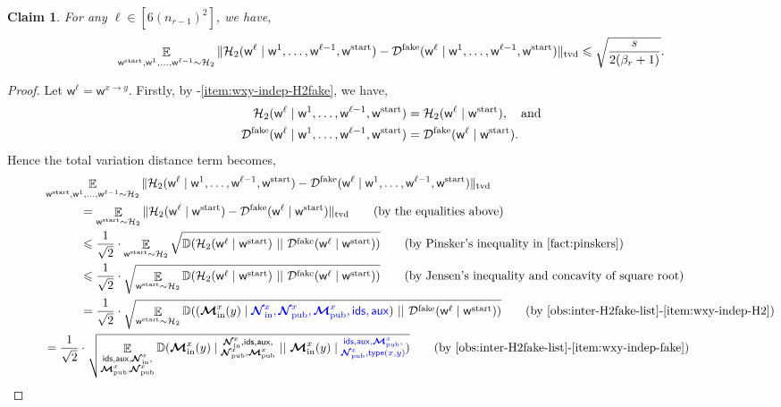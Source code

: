 \documentclass[11pt]{article}
\newtheorem{claim}[lemma]{Claim}
\theoremstyle{definition}
\renewcommand{\leq}{\leqslant}
\newcommand{\tvd}[2]{\ensuremath{\norm{#1 - #2}_{\mathrm{tvd}}}}
\newcommand{\norm}[1]{\ensuremath{\|#1\|}}
\DeclareMathOperator*{\Exp}{\ensuremath{{\mathbb{E}}}}
\newcommand{\rv}[1]{\ensuremath{{\mathsf{#1}}}\xspace}
\newcommand{\kl}[2]{\ensuremath{\mathbb{D}(#1~||~#2)}}
\newcommand{\rtypeval}[1]{\ensuremath{\rv{type}(#1)}}
\newcommand{\rNinner}[2]{\ensuremath{\bm{\mathcal{N}}_{\textnormal{in}}^{#1_{#2}}}}
\newcommand{\cH}{\ensuremath{\mathcal{H}}}
\newcommand{\cD}{\ensuremath{\mathcal{D}}}
\newcommand{\cDfake}{\ensuremath{\cD^{\textnormal{fake}}}}
\newcommand{\raux}{\ensuremath{\rv{aux}}}
\newcommand{\rNpub}[1]{\ensuremath{\bm{\mathcal{N}}_{\textnormal{pub}}^{#1}}}
\newcommand{\rMpub}[1]{\ensuremath{\bm{\mathcal{M}}_{\textnormal{pub}}^{#1}}}
\newcommand{\rMinner}[1]{\ensuremath{\bm{\mathcal{M}}_{\textnormal{in}}^{#1}}}
\newcommand{\rids}{\ensuremath{\rv{ids}}}
\newcommand{\rw}{\rv{w}}
\newcommand{\rwstart}{\rv{w}^{\textnormal{start}}}
\begin{document}
\begin{claim}\label{clm:inter-H2fake}
	For any $\ell \in [6(n_{r-1})^2]$, we have, 
	\[
	\Exp_{\rwstart, \rw^1, \ldots, \rw^{\ell-1} \sim \cH_2}	\tvd{\cH_2(\rw^{\ell} \mid \rw^1, \ldots, \rw^{\ell-1}, \rwstart)}{\cDfake(\rw^{\ell} \mid \rw^1, \ldots, \rw^{\ell-1}, \rwstart)} \leq  \sqrt{\frac{s}{2(\beta_r + 1)}}.
	\]
\end{claim}
\begin{proof}
	Let $\rw^{\ell} = \rw^{x \to y}$.
	Firstly, by -\ref{item:wxy-indep-H2fake}, we have, 
	\begin{align*}
	\cH_2(\rw^{\ell} \mid \rw^1, \ldots, \rw^{\ell-1}, \rwstart) &= \cH_2(\rw^{\ell} \mid  \rwstart), \quad \text{and} \\
		\cDfake(\rw^{\ell} \mid \rw^1, \ldots, \rw^{\ell-1}, \rwstart) &= \cDfake(\rw^{\ell} \mid  \rwstart).
	\end{align*}
	Hence the total variation distance term becomes, 
	\begin{align*}
		&\Exp_{\rwstart, \rw^1, \ldots, \rw^{\ell-1} \sim \cH_2}	\tvd{\cH_2(\rw^{\ell} \mid \rw^1, \ldots, \rw^{\ell-1}, \rwstart)}{\cDfake(\rw^{\ell} \mid \rw^1, \ldots, \rw^{\ell-1}, \rwstart)} \\
		&\hspace{30pt}=	\Exp_{\rwstart\sim \cH_2}	\tvd{\cH_2(\rw^{\ell} \mid  \rwstart)}{\cDfake(\rw^{\ell} \mid  \rwstart)} \tag{by the equalities above} \\
		&\hspace{30pt}\leq \frac1{\sqrt{2}} \cdot \Exp_{\rwstart \sim \cH_2} \sqrt{\kl{\cH_2(\rw^{\ell} \mid \rwstart)}{\cDfake(\rw^{\ell} \mid \rwstart)}} \tag{by Pinsker's inequality in \Cref{fact:pinskers}}\\
		&\hspace{30pt}\leq \frac1{\sqrt{2}} \cdot \sqrt{ \Exp_{\rwstart \sim \cH_2} \kl{\cH_2(\rw^{\ell} \mid \rwstart)}{\cDfake(\rw^{\ell} \mid \rwstart)}} \tag{by Jensen's inequality and concavity of square root} \\
		&\hspace{30pt}= \frac1{\sqrt{2}} \cdot \sqrt{ \Exp_{\rwstart \sim \cH_2} \kl{(\rMinner{x}(y) \mid \eqcolor{\rNinner{x}{}, \rNpub{x}, \rMpub{x}, \rids, \raux})}{\cDfake(\rw^{\ell} \mid \rwstart)}} \tag{by \Cref{obs:inter-H2fake-list}-\ref{item:wxy-indep-H2}} \\
		\hspace{30pt}&= \frac1{\sqrt{2}} \cdot \sqrt{ \Exp_{\substack{\rids, \raux, \rNinner{x}{}, \\ \rMpub{x}, \rNpub{x} }} \kl{\rMinner{x}(y) \mid \substack{\rNinner{x}{}, \rids, \raux, \\ \rNpub{x}, \rMpub{x}}}{\rMinner{x}(y) \mid \eqcolor{\substack{\rids, \raux, \rMpub{x}, \\ \rNpub{x}, \rtypeval{x,y}}}}} \tag{by \Cref{obs:inter-H2fake-list}-\ref{item:wxy-indep-fake}}\\

\end{align*}
\end{proof}
\end{document}
